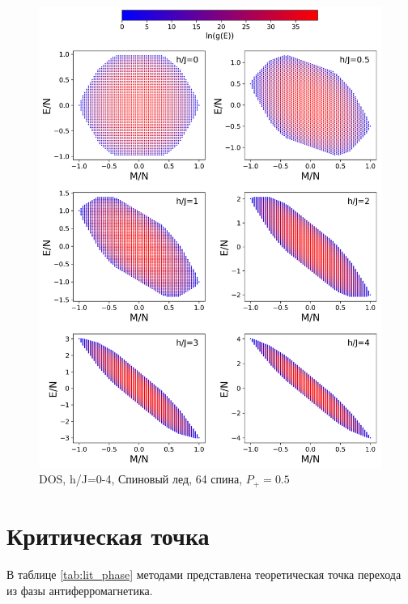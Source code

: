 \documentclass[utf8, babel, sor, jor, amsmath, amssymb, reprint]{elsarticle} %
\begin{document}
\begin{figure}[H]
	\centering
	\includegraphics[width=1\linewidth]{pictures/HDOS_SI_64_J0.png}
	\caption{DOS, h/J=0-4, Спиновый лед, 64 спина, $P_+ = 0.5$}
	\label{fig:HDOS_ice}
\end{figure}

\section{Критическая точка}

В таблице \ref{tab:lit_phase} методами представлена теоретическая точка перехода из фазы антиферромагнетика.
\end{document}
